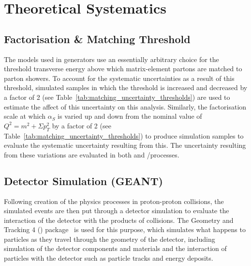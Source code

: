 \section{Theoretical Systematics}
\label{s:Theoretical Systematics}
\subsection{Factorisation \& Matching Threshold}
\label{ss:factorisation_and_matching_threshold}
The models used in generators use an essentially arbitrary choice for the threshold transverse energy above
which matrix-element partons are matched to parton showers. To account for the systematic uncertainties as a result
of this threshold, simulated samples in which the threshold is increased and decreased by a factor of 2 (see
Table~\ref{tab:matching_uncertainty_thresholds}) are used to estimate the affect of this uncertainty on this
analysis. Similarly, the factorisation scale at which $\alpha_{S}$ is varied up and down from the nominal
value of $Q^{2} = m^{2} + \Sigma p_{T}^{2}$ by a factor of 2 (see Table~\ref{tab:matching_uncertainty_thresholds}) to
produce simulation samples to evaluate the systematic uncertainty resulting from this. The uncertainty
resulting from these variations are evaluated in both \ttbar and \W/\ZpJets processes.



\subsection{Detector Simulation (GEANT)}
\label{ss:detector_simulation}
Following creation of the physics processes in proton-proton collisions, the simulated events are then put
through a detector simulation to evaluate the interaction of the detector with the products of collisions. The
Geometry and Tracking 4 (\GEANTfour) package~\cite{Agostinelli:2002hh,Allison:2006ve} is used for this
purpose, which simulates what happens to particles as they travel through the geometry of the detector,
including simulation of the detector components and materials and the interaction of particles with the
detector such as particle tracks and energy deposits.